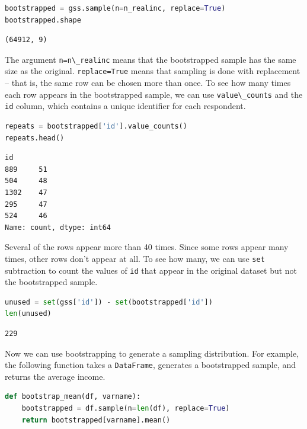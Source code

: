 \begin{lstlisting}[language=Python,style=source]
bootstrapped = gss.sample(n=n_realinc, replace=True)
bootstrapped.shape
\end{lstlisting}

\begin{lstlisting}[style=output]
(64912, 9)
\end{lstlisting}

The argument \passthrough{\lstinline!n=n\_realinc!} means that the
bootstrapped sample has the same size as the original.
\passthrough{\lstinline!replace=True!} means that sampling is done with
replacement -- that is, the same row can be chosen more than once. To
see how many times each row appears in the bootstrapped sample, we can
use \passthrough{\lstinline!value\_counts!} and the
\passthrough{\lstinline!id!} column, which contains a unique identifier
for each respondent.

\begin{lstlisting}[language=Python,style=source]
repeats = bootstrapped['id'].value_counts()
repeats.head()
\end{lstlisting}

\begin{lstlisting}[style=output]
id
889     51
504     48
1302    47
295     47
524     46
Name: count, dtype: int64
\end{lstlisting}

Several of the rows appear more than 40 times. Since some rows appear
many times, other rows don't appear at all. To see how many, we can use
\passthrough{\lstinline!set!} subtraction to count the values of
\passthrough{\lstinline!id!} that appear in the original dataset but not
the bootstrapped sample.

\begin{lstlisting}[language=Python,style=source]
unused = set(gss['id']) - set(bootstrapped['id'])
len(unused)
\end{lstlisting}

\begin{lstlisting}[style=output]
229
\end{lstlisting}

Now we can use bootstrapping to generate a sampling distribution. For
example, the following function takes a
\passthrough{\lstinline!DataFrame!}, generates a bootstrapped sample,
and returns the average income.

\begin{lstlisting}[language=Python,style=source]
def bootstrap_mean(df, varname):
    bootstrapped = df.sample(n=len(df), replace=True)
    return bootstrapped[varname].mean()
\end{lstlisting}

